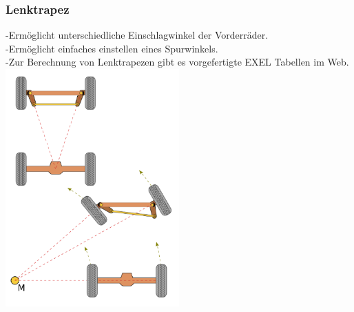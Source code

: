 \subsubsection{Lenktrapez}
-Ermöglicht unterschiedliche Einschlagwinkel der Vorderräder.\\
-Ermöglicht einfaches einstellen eines Spurwinkels.\\
-Zur Berechnung von Lenktrapezen gibt es vorgefertigte EXEL Tabellen im Web.\\
\includegraphics[width=0.5\textwidth]{Images/Lenktrapez.png}

